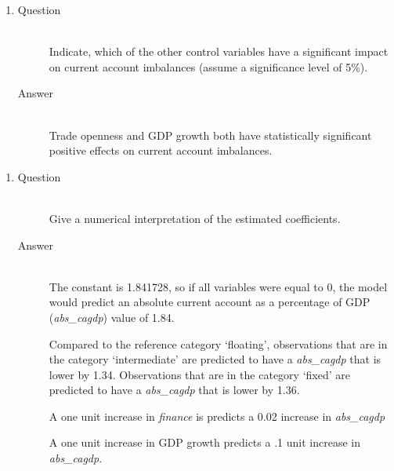 \documentclass{article}
\begin{document}
  \begin{enumerate}[label=(\alph*)]
    \item 
    \begin{description}
      \item[Question] \hfill \\
      Indicate, which of the other control variables have a significant impact on current account imbalances (assume a significance level of 5\%).
      \item[Answer] \hfill \\
      Trade openness and GDP growth both have statistically significant positive effects on current account imbalances.
    \end{description}
  \end{enumerate}
  
  \begin{enumerate}[label=(\alph*)]
    \item 
    \begin{description}
      \item[Question] \hfill \\
      Give a numerical interpretation of the estimated coefficients.
      \item[Answer] \hfill \\
      The constant is 1.841728, so if all variables were equal to 0, the model would predict an absolute current account as a percentage of GDP (\textit{abs\_cagdp}) value of 1.84. 
      
      Compared to the reference category `floating', observations that are in the category `intermediate' are predicted to have a \textit{abs\_cagdp} that is lower by 1.34. Observations that are in the category `fixed' are predicted to have a \textit{abs\_cagdp} that is lower by 1.36.
      
      A one unit increase in \textit{finance} is predicts a 0.02 increase in \textit{abs\_cagdp}
      
      A one unit increase in GDP growth predicts a .1 unit increase in \textit{abs\_cagdp}.

    \end{description}
  \end{enumerate}
  
\end{document}
